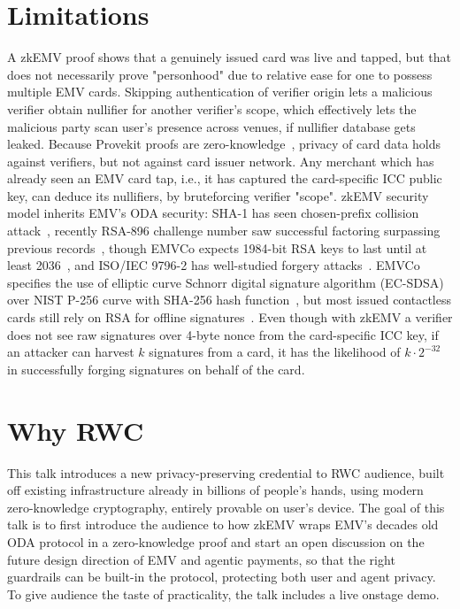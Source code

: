 \documentclass[10pt,a4paper]{article}
\begin{document}
\section{Limitations}

A zkEMV proof shows that a genuinely issued card was live and tapped, but that does not necessarily prove "personhood" due to relative ease for one to possess multiple EMV cards.
Skipping authentication of verifier origin lets a malicious verifier obtain nullifier for another verifier's scope, which effectively lets the malicious party scan user's presence across venues, if nullifier database gets leaked.
Because Provekit proofs are zero-knowledge~\cite{world-provekit}, privacy of card data holds against verifiers, but not against card issuer network.
Any merchant which has already seen an EMV card tap, i.e., it has captured the card-specific ICC public key, can deduce its nullifiers, by bruteforcing verifier "scope".
zkEMV security model inherits EMV's ODA security: SHA-1 has seen chosen-prefix collision attack~\cite{DBLP:conf/uss/LeurentP20}, recently RSA-896 challenge number saw successful factoring surpassing previous records~\cite{weis-rsa896}, though EMVCo expects 1984-bit RSA keys to last until at least 2036~\cite{emvco-kl30}, and ISO/IEC 9796-2 has well-studied forgery attacks~\cite{DBLP:conf/crypto/CoronNTW09}.
EMVCo specifies the use of elliptic curve Schnorr digital signature algorithm (EC-SDSA) over NIST P-256 curve with SHA-256 hash function~\cite{emv-c8,emv-book-e}, but most issued contactless cards still rely on RSA for offline signatures~\cite{emvco-quantum}.
Even though with zkEMV a verifier does not see raw signatures over 4-byte nonce from the card-specific ICC key, if an attacker can harvest $k$ signatures from a card, it has the likelihood of $k \cdot 2^{-32}$ in successfully forging signatures on behalf of the card.

\section{Why RWC}

This talk introduces a new privacy-preserving credential to RWC audience, built off existing infrastructure already in billions of people's hands, using modern zero-knowledge cryptography, entirely provable on user's device.
The goal of this talk is to first introduce the audience to how zkEMV wraps EMV's decades old ODA protocol in a zero-knowledge proof and start an open discussion on the future design direction of EMV and agentic payments, so that the right guardrails can be built-in the protocol, protecting both user and agent privacy.
To give audience the taste of practicality, the talk includes a live onstage demo.
\end{document}
